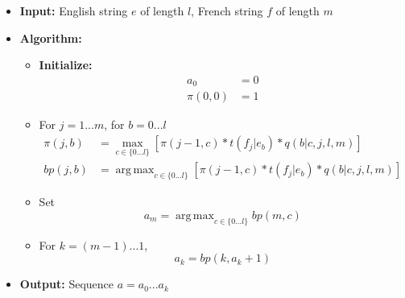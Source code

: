 \documentclass[11pt]{scrartcl}
\DeclareMathOperator*{\argmax}{arg\,max}
\begin{document}
\section{}

\begin{itemize}
\item \textbf{Input:} English string $e$ of length $l$, French string $f$ of length $m$
\item \textbf{Algorithm:}
\begin{itemize}
\item \textbf{Initialize:}
\begin{align*}
a_0 &= 0 \\
\pi(0, 0) &= 1
\end{align*}
\item For $j = 1...m$, for $b = 0 ... l$
\begin{align*}
\pi(j, b) &= \max_{c \in \{0 ... l\}} \left[ \pi(j-1, c) * t(f_j | e_b) * q(b | c, j, l, m) \right] \\
bp(j, b) &= \argmax_{c \in \{0...l\}} \left[ \pi(j-1, c) * t(f_j | e_b) * q(b | c, j, l, m) \right]
\end{align*}
\item Set 
\[a_m = \argmax_{c \in \{0 ... l\}} bp(m, c)\]
\item For $k = (m - 1) ... 1$, 
\[a_k = bp(k, a_k+1)\]
\end{itemize}
\item \textbf{Output:} Sequence $a = a_0 ... a_k$
\end{itemize}
\end{document}
